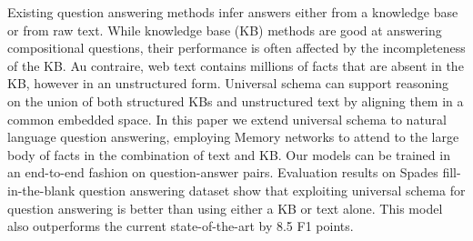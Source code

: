 Existing question answering methods infer answers either from a knowledge base or from raw text. While knowledge base (KB) methods are good at answering compositional questions, their performance is often affected by the incompleteness of the KB. Au contraire, web text contains millions of facts that are absent in the KB, however in an unstructured form. Universal schema can support reasoning on the union of both structured KBs and unstructured text by aligning them in a common embedded space. In this paper we extend universal schema to natural language question answering, employing Memory networks to attend to the large body of facts in the combination of text and KB. Our models can be trained in an end-to-end fashion on question-answer pairs. Evaluation results on Spades fill-in-the-blank question answering dataset show that exploiting universal schema for question answering is better than using either a KB or text alone. This model also outperforms the current state-of-the-art by 8.5 F1 points.
